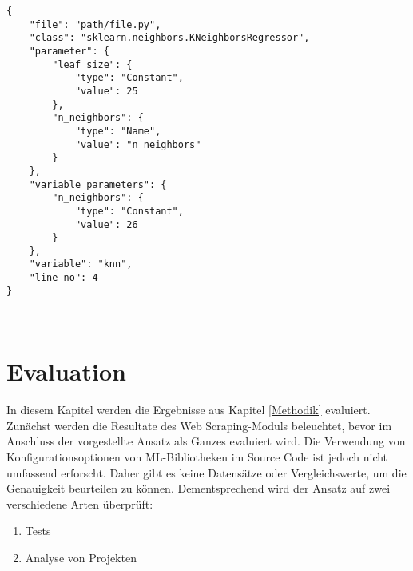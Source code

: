 \documentclass[german,bachelor]{swsLeipzig}
\begin{document}
\noindent\begin{minipage}{\linewidth}
\begin{lstlisting}[style=json, frame=single, label=final_dict, basicstyle=\small, caption={JSON-Eintrag der KNeighborsRegressor-Klasse mit möglichen Parameterwerten},captionpos=b]
{
    "file": "path/file.py",
    "class": "sklearn.neighbors.KNeighborsRegressor",
    "parameter": {
        "leaf_size": {
            "type": "Constant",
            "value": 25
        },
        "n_neighbors": {
            "type": "Name",
            "value": "n_neighbors"
        }
    },
    "variable parameters": {
        "n_neighbors": {
            "type": "Constant",
            "value": 26
        }
    },
    "variable": "knn",
    "line no": 4
}
\end{lstlisting}
\end{minipage}
\


\chapter{Evaluation}\label{Evaluation}
In diesem Kapitel werden die Ergebnisse aus Kapitel \ref{Methodik} evaluiert.
Zunächst werden die Resultate des Web Scraping-Moduls beleuchtet, bevor im Anschluss der vorgestellte Ansatz
als Ganzes evaluiert wird.
Die Verwendung von Konfigurationsoptionen von ML-Bibliotheken im Source Code ist jedoch nicht umfassend erforscht.
Daher gibt es keine Datensätze oder Vergleichswerte, um die Genauigkeit beurteilen zu können.
Dementsprechend wird der Ansatz auf zwei verschiedene Arten überprüft:
\begin{enumerate}
 \item Tests
 \item Analyse von Projekten
\end{enumerate}
\end{document}
